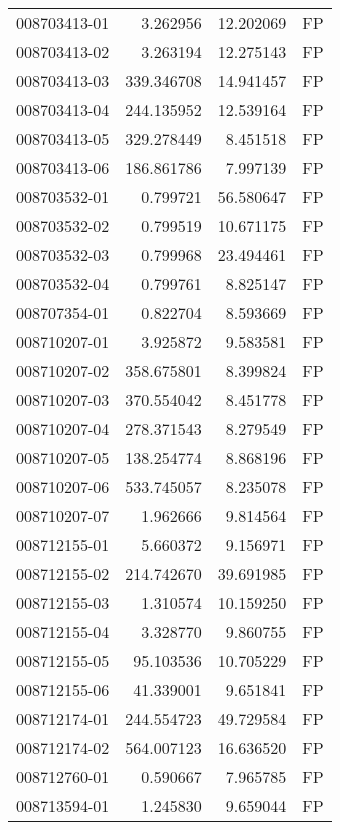 \begin{tabular}{lrrl}
008703413-01 &    3.262956 &      12.202069 &   FP \\
008703413-02 &    3.263194 &      12.275143 &   FP \\
008703413-03 &  339.346708 &      14.941457 &   FP \\
008703413-04 &  244.135952 &      12.539164 &   FP \\
008703413-05 &  329.278449 &       8.451518 &   FP \\
008703413-06 &  186.861786 &       7.997139 &   FP \\
008703532-01 &    0.799721 &      56.580647 &   FP \\
008703532-02 &    0.799519 &      10.671175 &   FP \\
008703532-03 &    0.799968 &      23.494461 &   FP \\
008703532-04 &    0.799761 &       8.825147 &   FP \\
008707354-01 &    0.822704 &       8.593669 &   FP \\
008710207-01 &    3.925872 &       9.583581 &   FP \\
008710207-02 &  358.675801 &       8.399824 &   FP \\
008710207-03 &  370.554042 &       8.451778 &   FP \\
008710207-04 &  278.371543 &       8.279549 &   FP \\
008710207-05 &  138.254774 &       8.868196 &   FP \\
008710207-06 &  533.745057 &       8.235078 &   FP \\
008710207-07 &    1.962666 &       9.814564 &   FP \\
008712155-01 &    5.660372 &       9.156971 &   FP \\
008712155-02 &  214.742670 &      39.691985 &   FP \\
008712155-03 &    1.310574 &      10.159250 &   FP \\
008712155-04 &    3.328770 &       9.860755 &   FP \\
008712155-05 &   95.103536 &      10.705229 &   FP \\
008712155-06 &   41.339001 &       9.651841 &   FP \\
008712174-01 &  244.554723 &      49.729584 &   FP \\
008712174-02 &  564.007123 &      16.636520 &   FP \\
008712760-01 &    0.590667 &       7.965785 &   FP \\
008713594-01 &    1.245830 &       9.659044 &   FP \\

\end{tabular}
